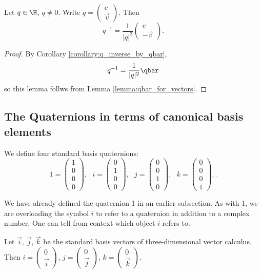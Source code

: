 \documentclass[oneside,12pt]{amsart}
\begin{document}
 \begin{lemma}
Let $q\in\H$, $q\not=0$.
Write $q=\begin{pmatrix}c\\ \vec{v}\end{pmatrix}$. Then
$$q^{-1} = \frac{1}{|q|^2}\begin{pmatrix}c\\ -\vec{v}\end{pmatrix}.$$
\end{lemma}
\begin{proof}
By Corollary \ref{corollary:q_inverse_by_qbar}, 
$$q^{-1} = \frac{1}{|q|^2}\qbar$$ so this lemma
follws from Lemma \ref{lemma:qbar_for_vectors}.
\end{proof}


\subsection{The Quaternions in terms of canonical basis elements}

We define four standard basis quaternions:
$$
1 = \begin{pmatrix}1\\0\\0\\0\end{pmatrix},\text{  }
i =  \begin{pmatrix}0\\1\\0\\0\end{pmatrix},\text{  }
j =  \begin{pmatrix}0\\0\\1\\0\end{pmatrix},\text{  }
k =  \begin{pmatrix}0\\0\\0\\1\end{pmatrix},\text{.}
$$

\begin{note}
We have already defined the quaternion 1 in an earlier subsection.
As with 1, we are overloading the symbol $i$ to refer to a quaternion in addition
to a complex number. One can tell from context which object $i$ refers to.
\end{note}

\begin{remark}
Let $\vec{i}$, $\vec{j}$, $\vec{k}$ be the standard basis vectors of three-dimensional vector calculus.
Then
$i = \begin{pmatrix}0\\\vec{i}\end{pmatrix}$, 
$j = \begin{pmatrix}0\\\vec{j}\end{pmatrix}$, 
$k = \begin{pmatrix}0\\\vec{k}\end{pmatrix}$.
\end{remark}
\end{document}
